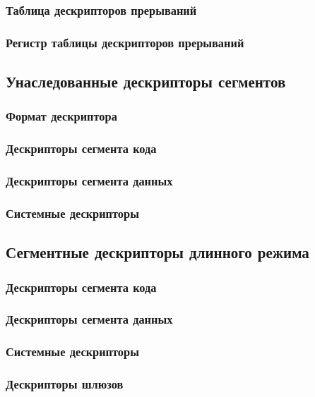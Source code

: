 \subsubsection*{Таблица дескрипторов прерываний}
\subsubsection*{Регистр таблицы дескрипторов прерываний}

\subsection{Унаследованные дескрипторы сегментов}
\subsubsection*{Формат дескриптора}
\subsubsection*{Дескрипторы сегмента кода}
\subsubsection*{Дескрипторы сегмента данных}
\subsubsection*{Системные дескрипторы}

\subsection{Сегментные дескрипторы длинного режима}
\subsubsection*{Дескрипторы сегмента кода}
\subsubsection*{Дескрипторы сегмента данных}
\subsubsection*{Системные дескрипторы}
\label{subsec:system_desriptor_format}
\subsubsection*{Дескрипторы шлюзов}

